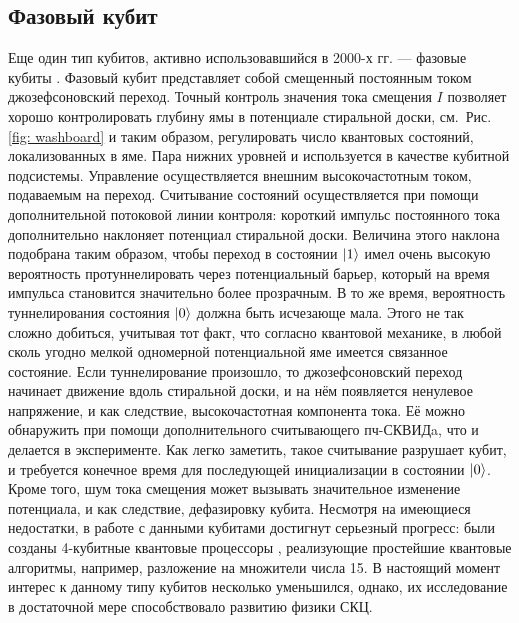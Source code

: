 \subsection{Фазовый кубит}
Еще один тип кубитов, активно использовавшийся в 2000-х гг. --- фазовые кубиты \cite{martinis2009superconducting}. Фазовый кубит представляет собой смещенный постоянным током джозефсоновский переход. Точный контроль значения тока смещения $I$ позволяет хорошо контролировать глубину ямы в потенциале стиральной доски, см.~Рис. \ref{fig: washboard} и таким образом, регулировать число квантовых состояний, локализованных в яме. Пара нижних уровней и используется в качестве кубитной подсистемы. Управление осуществляется внешним высокочастотным током, подаваемым на переход. Считывание состояний \cite{steffen2006measurement} осуществляется при помощи дополнительной потоковой линии контроля: короткий импульс постоянного тока дополнительно наклоняет потенциал стиральной доски. Величина этого наклона подобрана таким образом, чтобы переход в состоянии $\ket{1}$ имел очень высокую вероятность протуннелировать через потенциальный барьер, который на время импульса становится значительно более прозрачным. В то же время, вероятность туннелирования состояния $\ket{0}$ должна быть исчезающе мала. Этого не так сложно добиться, учитывая тот факт, что согласно квантовой механике, в любой сколь угодно мелкой одномерной потенциальной яме имеется связанное состояние. Если туннелирование произошло, то джозефсоновский переход начинает движение вдоль стиральной доски, и на нём появляется ненулевое напряжение, и как следствие, высокочастотная компонента тока. Её можно обнаружить при помощи дополнительного считывающего пч-СКВИДa, что и делается в эксперименте. Как легко заметить, такое считывание разрушает кубит, и требуется конечное время для последующей инициализации в состоянии $\ket{0}$. Кроме того, шум тока смещения может вызывать значительное изменение потенциала, и как следствие, дефазировку кубита. Несмотря на имеющиеся недостатки, в работе с данными кубитами достигнут серьезный прогресс: были созданы 4-кубитные квантовые процессоры \cite{lucero2012computing}, реализующие простейшие квантовые алгоритмы, например, разложение на множители числа 15. В настоящий момент интерес к данному типу кубитов несколько уменьшился, однако, их исследование в достаточной мере способствовало развитию физики СКЦ.
 
